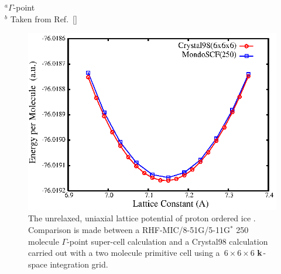\documentclass[prb,aps,nobibnotes,twocolumn,doublespace,twocolumngrid,superbib]{revtex4}
\begin{document}
\begin{table}[ht]
\caption{Lattice Constants in angstoms for the Diamond System for different 
system sizes, theory levels, and basis sets at a {\tt LOOSE} accuracy. For comparision, 
the experimental value for diamond, extrapolated to $T = 0 K$, is 
${\rm a}_0 = 3.567$\AA, while ${\rm a}_0 = 3.583$\AA~is obtained 
with both the RPBE/6-31G* GGA and the RTPSS/6-31G* meta-GGA level of theory \cite{JTao03}.}
\label{DiamondLC}
\raggedright{
{\hskip 0.33in}$^a \Gamma$-point\\
{\hskip 0.33in}$^b$ Taken from Ref.~[]\\}
\end{table}


\begin{figure}
\caption{The unrelaxed, uniaxial lattice potential of proton ordered ice \cite{}.
Comparison is made between a RHF-MIC/8-51G/5-11G$^*$ 250 molecule $\Gamma$-point super-cell 
calculation and a {\sc Crystal98} calculation carried out with a two molecule primitive
cell using a~$6\times6\times6$ ${\bf k}$-space integration grid.}
\label{IceEnergyVsLattice}
{\center \includegraphics{pIce_En_vs_a.ps}\par}
\end{figure}
\end{document}
